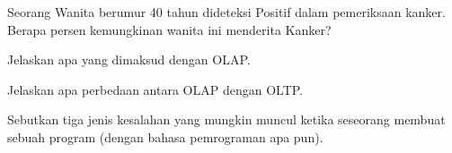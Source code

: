 \documentclass[a4paper,12pt,answers]{exam}
\begin{document}
\begin{questions}
	Seorang Wanita berumur 40 tahun dideteksi Positif dalam pemeriksaan kanker. Berapa persen kemungkinan wanita ini menderita Kanker?
	\begin{solution}
	  \vspace{5.0cm}
	\end{solution}


	\question[10] Jelaskan apa yang dimaksud dengan OLAP.
	\begin{solution}
	  \vspace{3.0cm}
	\end{solution}
	
	
	\question[10] Jelaskan apa perbedaan antara OLAP dengan OLTP.
	\begin{solution}
	  \vspace{5.0cm}
	\end{solution}
	
	
	\question[10] Sebutkan tiga jenis kesalahan yang mungkin muncul ketika seseorang membuat sebuah program (dengan bahasa pemrograman apa pun).
	\begin{solution}
	  \vspace{3.0cm}
	\end{solution}
	
	
\end{questions}
\end{document}
